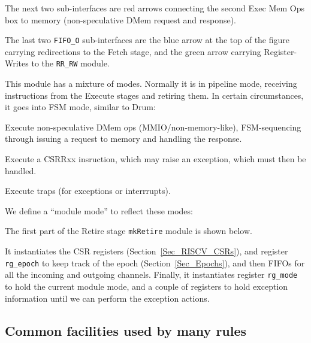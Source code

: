 The next two sub-interfaces are red arrows connecting the second Exec
Mem Ops box to memory (non-speculative DMem request and response).

The last two \verb|FIFO_O| sub-interfaces are the blue arrow at the
top of the figure carrying redirections to the Fetch stage, and the
green arrow carrying Register-Writes to the \verb|RR_RW| module.

This module has a mixture of modes.  Normally it is in pipeline mode,
receiving instructions from the Execute stages and retiring them.  In
certain circumstances, it goes into FSM mode, similar to Drum:

\begin{tightlist}

 \item Execute non-speculative DMem ops (MMIO/non-memory-like),
        FSM-sequencing through issuing a request to memory and
        handling the response.

 \item Execute a CSRRxx insruction, which may raise an exception,
       which must then be handled.

 \item Execute traps (for exceptions or interrrupts).

\end{tightlist}

We define a ``module mode'' to reflect these modes:



The first part of the Retire stage \verb|mkRetire| module is shown below.



It instantiates the CSR registers (Section~\ref{Sec_RISCV_CSRs}), and
register \verb|rg_epoch| to keep track of the epoch
(Section~\ref{Sec_Epochs}), and then FIFOs for all the incoming and
outgoing channels.  Finally, it instantiates register \verb|rg_mode|
to hold the current module mode, and a couple of registers to hold
exception information until we can perform the exception actions.


\subsection{Common facilities used by many rules}

\label{Sec_Retire_Common}

